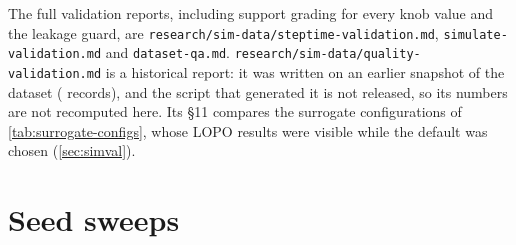 \begin{table}[!htbp]
  \centering
  \caption{\textbf{Step-time model, end-to-end anchors and the offset model.} End-to-end rows compare the Monte Carlo
    prediction at seed~73 with the measured upload (\texttt{docs/SIMULATOR.md}\docnum{}).}
  \label{tab:sim-other}
  
\end{table}

The full validation reports, including support grading for every knob value and the leakage guard, are
\texttt{research/sim-data/steptime-validation.md}, \texttt{simulate-validation.md} and \texttt{dataset-qa.md}.
\texttt{research/sim-data/quality-validation.md} is a historical report: it was written on an earlier snapshot of the
dataset (\docnum{} records), and the script that generated it is not released, so its numbers are
not recomputed here. Its \S11 compares the \docnum{} surrogate configurations of \cref{tab:surrogate-configs},
whose LOPO results were visible while the default was chosen (\cref{sec:simval}).

\begin{table}[!htbp]
  \centering
  \caption{\textbf{The surrogate configurations compared during development}, as printed in
    \texttt{research/sim-data/quality-validation.md} \S11\docnum{} (an earlier snapshot of the data; MAE in
    $10^{-3}$ bpb). The first LOPO and the LOKVO columns use the pairs named in the simulator's specification;
    ``recipe'' is the subset that changes the recipe, and ``Decisive'' its decisive pairs as defined in that report.
    The default configuration, in bold, is the one used throughout the paper.}
  \label{tab:surrogate-configs}
  
\end{table}

\section{Seed sweeps}

\begin{table}[!htbp]
  \centering
  \caption{\textbf{Warm-up paths in three seed sweeps of a fixed recipe} (full chip runs that differ only in the
    seed; $10^{-3}$ bpb). ``Spike'': step-10 loss $\ge$ nats; ``Interm.'': between  and
    . The difference is a Welch mean difference with 95\% CI. Generated by
    \texttt{paper/analysis/seeds.py}.}
  \label{tab:seeds}
  
\end{table}

